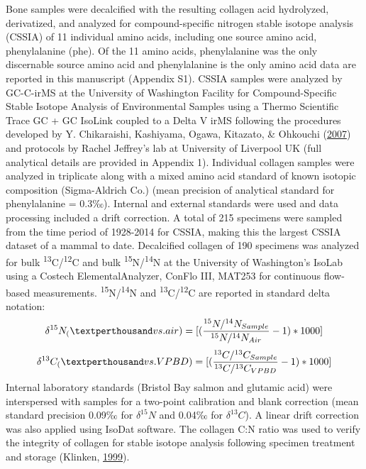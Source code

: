 \documentclass [11pt, proquest] {uwthesis}[2015/03/03]
\begin{document}
Bone samples were decalcified with the resulting collagen acid
hydrolyzed, derivatized, and analyzed for compound-specific nitrogen
stable isotope analysis (CSSIA) of 11 individual amino acids, including
one source amino acid, phenylalanine (phe). Of the 11 amino acids,
phenylalanine was the only discernable source amino acid and
phenylalanine is the only amino acid data are reported in this
manuscript (Appendix S1). CSSIA samples were analyzed by GC-C-irMS at
the University of Washington Facility for Compound-Specific Stable
Isotope Analysis of Environmental Samples using a Thermo Scientific
Trace GC + GC IsoLink coupled to a Delta V irMS following the procedures
developed by Y. Chikaraishi, Kashiyama, Ogawa, Kitazato, \& Ohkouchi
(\protect\hyperlink{ref-Chikaraishi2007}{2007}) and protocols by Rachel
Jeffrey's lab at University of Liverpool UK (full analytical details are
provided in Appendix 1). Individual collagen samples were analyzed in
triplicate along with a mixed amino acid standard of known isotopic
composition (Sigma-Aldrich Co.) (mean precision of analytical standard
for phenylalanine = 0.3‰). Internal and external standards were used and
data processing included a drift correction. A total of 215 specimens
were sampled from the time period of 1928-2014 for CSSIA, making this
the largest CSSIA dataset of a mammal to date. Decalcified collagen of
190 specimens was analyzed for bulk
\textsuperscript{13}C/\textsuperscript{12}C and bulk
\textsuperscript{15}N/\textsuperscript{14}N at the University of
Washington's IsoLab using a Costech ElementalAnalyzer, ConFlo III,
MAT253 for continuous flow-based measurements.
\textsuperscript{15}N/\textsuperscript{14}N and
\textsuperscript{13}C/\textsuperscript{12}C are reported in standard
delta notation:
\begin{equation} 
  \delta^{15}N_ ( \textperthousand vs. air) =   
  [(\frac{^{15}N/^{14}N_{Sample}}{^{15}N/^{14}N_{Air}} -1)*1000]
  \label{eq:deltN}
\end{equation}
\begin{equation} 
  \delta^{13}C_ ( \textperthousand vs. VPBD) =   
  [(\frac{^{13}C/^{13}C_{Sample}}{^{13}C/^{13}C_{VPBD}} -1)*1000]
  \label{eq:deltC}
\end{equation}
Internal laboratory standards (Bristol Bay salmon and glutamic acid)
were interspersed with samples for a two-point calibration and blank
correction (mean standard precision 0.09‰ for \(\delta^{15}N\) and 0.04‰
for \(\delta^{13}C\)). A linear drift correction was also applied using
IsoDat software. The collagen C:N ratio was used to verify the integrity
of collagen for stable isotope analysis following specimen treatment and
storage (Klinken, \protect\hyperlink{ref-vanKlinken1999}{1999}).
\end{document}
